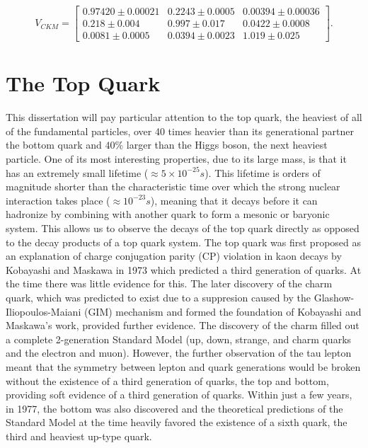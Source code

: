 \[ V_{CKM} =
\begin{bmatrix}
0.97420 \pm 0.00021 & 0.2243 \pm 0.0005 & 0.00394 \pm 0.00036 \\ 
0.218 \pm 0.004 & 0.997 \pm 0.017 & 0.0422 \pm 0.0008 \\
0.0081 \pm 0.0005 & 0.0394 \pm 0.0023 & 1.019 \pm 0.025 
\end{bmatrix}.
\]


\section{The Top Quark}

This dissertation will pay particular attention to the top quark, the heaviest of all of the fundamental particles, over 40 times heavier than its generational partner the bottom quark and $40\%$ larger than the Higgs boson, the next heaviest particle.  One of its most interesting properties, due to its large mass, is that it has an extremely small lifetime ($\approx 5 \times 10^{-25} s$).  This lifetime is orders of magnitude shorter than the characteristic time over which the strong nuclear interaction takes place ($\approx 10^{-23}s$), meaning that it decays before it can hadronize by combining with another quark to form a mesonic or baryonic system.  This allows us to observe the decays of the top quark directly as opposed to the decay products of a top quark system.
The top quark was first proposed as an explanation of charge conjugation parity (CP) violation in kaon decays by Kobayashi and Maskawa in 1973\cite{CKM2} which predicted a third generation of quarks.  At the time there was little evidence for this.  The later discovery of the charm quark, which was predicted to exist due to a suppresion caused by the Glashow-Iliopoulos-Maiani (GIM) mechanism\cite{GIM} and formed the foundation of Kobayashi and Maskawa's work, provided further evidence.  The discovery of the charm filled out a complete 2-generation Standard Model (up, down, strange, and charm quarks and the electron and muon).  However, the further observation of the tau lepton meant that the symmetry between lepton and quark generations would be broken without the existence of a third generation of quarks, the top and bottom, providing soft evidence of a third generation of quarks.  Within just a few years, in 1977, the bottom was also discovered\cite{BDiscovery} and the theoretical predictions of the Standard Model at the time heavily favored the existence of a sixth quark, the third and heaviest up-type quark.  

